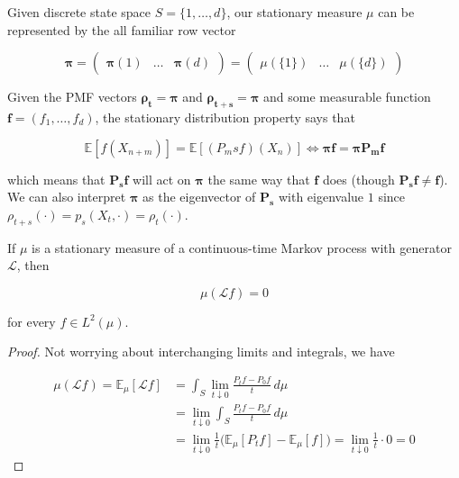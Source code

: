 \documentclass{article}
\begin{document}
    \begin{example}
      Given discrete state space $S = \{1, \ldots, d\}$, our stationary measure $\mu$ can be represented by the all familiar row vector 

        \[\boldsymbol{\pi} = \begin{pmatrix} \boldsymbol{\pi} (1) & \ldots & \boldsymbol{\pi} (d) \end{pmatrix} = \begin{pmatrix} \mu(\{1\}) & \ldots & \mu(\{d\}) \end{pmatrix}\] 

      Given the PMF vectors $\boldsymbol{\rho_t} = \boldsymbol{\pi}$ and $\boldsymbol{\rho_{t + s}} = \boldsymbol{\pi}$ and some measurable function $\mathbf{f} = (f_1, \ldots, f_d)$, the stationary distribution property says that 

        \[\mathbb{E}[f(X_{n + m})] = \mathbb{E}[(P_ms f)(X_n)] \iff \boldsymbol{\pi} \mathbf{f} = \boldsymbol{\pi} \mathbf{P_m} \mathbf{f}\]

      which means that $\mathbf{P_s} \mathbf{f}$ will act on $\boldsymbol{\pi}$ the same way that $\mathbf{f}$ does (though $\mathbf{P_s} \mathbf{f} \neq \mathbf{f}$). We can also interpret $\boldsymbol{\pi}$ as the eigenvector of $\mathbf{P_s}$ with eigenvalue $1$ since $\rho_{t + s} (\cdot) = p_s (X_t, \cdot) = \rho_t(\cdot)$. 
    \end{example}

    \begin{theorem}
      If $\mu$ is a stationary measure of a continuous-time Markov process with generator $\mathscr{L}$, then 

        \[\mu(\mathscr{L} f) = 0\]

      for every $f \in L^2 (\mu)$. 
    \end{theorem}
    \begin{proof}
    Not worrying about interchanging limits and integrals, we have 

    \begin{align*}
      \mu(\mathscr{L} f) = \mathbb{E}_\mu [\mathscr{L} f] & = \int_S \lim_{t \downarrow 0} \frac{P_t f - P_0 f}{t} \,d\mu \\ 
      & = \lim_{t \downarrow 0} \int_S \frac{P_t f - P_0 f}{t} \,d\mu \\
      & = \lim_{t \downarrow 0} \frac{1}{t} \big( \mathbb{E}_\mu [P_t f] - \mathbb{E}_\mu [f] \big) = \lim_{t \downarrow 0} \frac{1}{t} \cdot 0 = 0 
    \end{align*}
    \end{proof}
\end{document}
